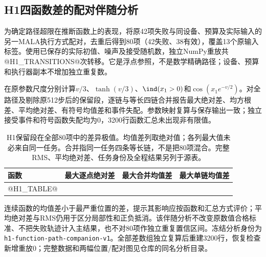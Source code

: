 \subsection{H1四函数差的配对伴随分析}
为确定路径超限在推断函数上的表现，将原42项失败与同设备、预算及实际输入的另一MALA执行方式配对，去重后得到80项（42失败、38有效），覆盖13个原输入标签。使用已保存的实际初值、噪声及接受随机数，独立NumPy重放共@H1_TRANSITIONS@次转移。它是浮点参照，不是数学精确路径；设备、预算和执行器副本不增加独立重复数。

在原参数尺度分别计算$v/3$、$\tanh(v/3)$、$\ind(x_1>0)$和$\cos(x_1e^{-v/2})$。对全路径及剔除原512步后的保留段，逐链与等长四链合并报告最大绝对差、均方根差、平均绝对差、有符号均值差和事件失配。参数映射复算与保存输出一致；独立接受事件和符号函数失配均为0，3200行函数汇总未出现非有限值。

\begin{table}[htbp]\centering\small
\begin{tabular}{lrrr}\toprule
函数 & 最大逐点绝对差 & 最大合并均值差 & 最大单链均值差\\\midrule
@H1_TABLE@
\bottomrule\end{tabular}
\caption{H1保留段在全部80项中的差异极值。均值差列取绝对值；各列最大值未必来自同一任务。合并指同一任务四条等长链，不是把80项混合。完整RMS、平均绝对差、任务身份及全程结果另列于源表。}
\label{tab:h1-function-companion}
\end{table}

连续函数的均值差小于最严重位置的差，提示其影响应按函数和汇总方式评价；平均绝对差与RMS仍用于区分局部性和正负抵消。该伴随分析不改变原数值合格标准、不把失败轨迹计入主结果，也不对80项作独立重复置信区间。冻结分析身份为\texttt{h1-function-path-companion-v1}。全部差数组独立复算后重建3200行，恢复检查新增重放0；完整数据和两幅位置/配对图见仓库的同名分析目录。
